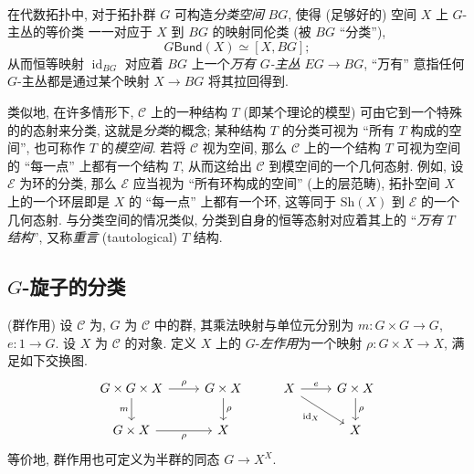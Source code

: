 ~\\

在代数拓扑中, 对于拓扑群 $G$ 可构造\emph{分类空间} $BG$,
使得 (足够好的) 空间 $X$ 上 $G$-主丛的等价类
一一对应于 $X$ 到 $BG$ 的映射同伦类 (被 $BG$ ``分类''),
$$
G\mathsf{Bund} (X) \simeq [X,BG];
$$
从而恒等映射 $\operatorname{id}_{BG}$ 对应着 $BG$ 上一个\emph{万有 $G$-主丛} $EG \to BG$,
``万有'' 意指任何 $G$-主丛都是通过某个映射 $X \to BG$ 将其拉回得到.

类似地, 在许多情形下, \topos{} $\mathcal C$ 上的一种结构 $T$ (即某个理论的模型) 可由它到一个特殊的\topos{}的态射来分类, 这就是\emph{分类\topos{}}的概念;
某种结构 $T$ 的分类\topos{}可视为 ``所有 $T$ 构成的空间'', 也可称作 $T$ 的\emph{模空间}.
若将\topos{} $\mathcal C$ 视为空间, 那么 $\mathcal C$ 上的一个结构 $T$ 可视为空间的 ``每一点'' 上都有一个结构 $T$,
从而这给出 $\mathcal C$ 到模空间的一个几何态射.
例如, 设 $\mathcal E$ 为环的分类\topos{}, 那么 $\mathcal E$ 应当视为 ``所有环构成的空间'' (上的层范畴), 拓扑空间 $X$ 上的一个环层即是 $X$ 的 ``每一点'' 上都有一个环,
这等同于 $\text{Sh}(X)$ 到 $\mathcal E$ 的一个几何态射.
与分类空间的情况类似, 分类\topos{}到自身的恒等态射对应着其上的 ``\emph{万有 $T$ 结构}'', 又称\emph{重言} (tautological) $T$ 结构.

\subsection{$G$-旋子的分类\topos{}}

\begin{definition}
	{(群作用)}
	设 $\mathcal C$ 为\topos{}, $G$ 为 $\mathcal C$ 中的群, 其乘法映射与单位元分别为 $m\colon G\times G\to G$, $e\colon 1\to G$. 设 $X$ 为 $\mathcal C$ 的对象. 定义 $X$ 上的 $G$-\emph{左作用}为一个映射 $\rho\colon G\times X\to X$, 满足如下交换图.
	\[\begin{tikzcd}[ampersand replacement=\&]
		{G\times G\times X} \& {G\times X} \& X \& {G\times X} \\
		{G\times X} \& X \&\& X
		\arrow["m"', from=1-1, to=2-1]
		\arrow["\rho", from=1-1, to=1-2]
		\arrow["\rho"', from=2-1, to=2-2]
		\arrow["\rho", from=1-2, to=2-2]
		\arrow["{\operatorname{id}_X}"', from=1-3, to=2-4]
		\arrow["e", from=1-3, to=1-4]
		\arrow["\rho", from=1-4, to=2-4]
	\end{tikzcd}\]
	等价地, 群作用也可定义为半群的同态 $G\to X^X$.
\end{definition}

